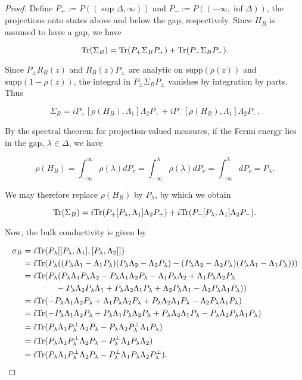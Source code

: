 \documentclass[12pt, letterpaper]{article}
\begin{document}
\begin{proof}
Define $P_+ := P((\sup \Delta, \infty))$ and $P_- := P((-\infty, \inf \Delta))$, the projections onto states above and below the gap, respectively. Since $H_B$ is assumed to have a gap, we have 

\[\text{Tr}(\Sigma_B) = \text{Tr}(P_+\Sigma_B P_+) + \text{Tr}(P_-\Sigma_B P_-).\]

Since $P_\pm R_B(z)$ and $R_B(z) P_\pm$ are analytic on $\text{supp}(\rho(z))$ and $\text{supp}(1-\rho(z))$, the integral in $P_\pm \Sigma_B P_\pm$ vanishes by integration by parts. Thus

\[\Sigma_B = iP_+[\rho(H_B),\Lambda_1]\Lambda_2P_+ + iP_-[\rho(H_B),\Lambda_1]\Lambda_2P_-.\]

By the spectral theorem for projection-valued measures, if the Fermi energy lies in the gap, $\lambda \in \Delta$, we have

\[ \rho(H_B) = \int_{-\infty}^\infty \rho(\lambda) dP_\nu = \int_{-\infty}^\lambda \rho(\lambda) dP_\nu = \int_{-\infty}^\lambda dP_\nu = P_\lambda.\]

We may therefore replace $\rho(H_B)$ by $P_\lambda$, by which we obtain

\[\text{Tr}(\Sigma_B) = i\text{Tr}(P_+[P_\lambda,\Lambda_1]\Lambda_2P_+) + i\text{Tr}(P_-[P_\lambda,\Lambda_1]\Lambda_2P_-).\]

Now, the bulk conductivity is given by

\[\begin{aligned}
\sigma_B &= i\text{Tr}(P_\lambda [[P_\lambda, \Lambda_1],[P_\lambda,\Lambda_2]])\\
&= i\text{Tr}(P_\lambda ((P_\lambda \Lambda_1-\Lambda_1P_\lambda)(P_\lambda\Lambda_2 - \Lambda_2P_\lambda) - (P_\lambda\Lambda_2 - \Lambda_2P_\lambda)(P_\lambda\Lambda_1-\Lambda_1P_\lambda)))\\
&= i\text{Tr}(P_\lambda(P_\lambda\Lambda_1P_\lambda\Lambda_2 - P_\lambda\Lambda_1\Lambda_2 P_\lambda - \Lambda_1P_\lambda\Lambda_2 + \Lambda_1P_\lambda\Lambda_2P_\lambda \\
&\quad\quad\quad\quad - P_\lambda\Lambda_2P_\lambda\Lambda_1 + P_\lambda\Lambda_2\Lambda_1P_\lambda + \Lambda_2P_\lambda\Lambda_1 - \Lambda_2P_\lambda\Lambda_1P_\lambda))\\
&= i\text{Tr}(- P_\lambda\Lambda_1\Lambda_2 P_\lambda + \Lambda_1P_\lambda\Lambda_2P_\lambda + P_\lambda\Lambda_2\Lambda_1P_\lambda - \Lambda_2P_\lambda\Lambda_1P_\lambda)\\
&= i\text{Tr}(- P_\lambda\Lambda_1\Lambda_2 P_\lambda + P_\lambda\Lambda_1P_\lambda\Lambda_2P_\lambda + P_\lambda\Lambda_2\Lambda_1P_\lambda - P_\lambda\Lambda_2P_\lambda\Lambda_1P_\lambda)\\
&= i\text{Tr}(P_\lambda\Lambda_1 P_\lambda^\perp \Lambda_2P_\lambda - P_\lambda\Lambda_2 P_\lambda^\perp \Lambda_1 P_\lambda)\\
&= i\text{Tr}(P_\lambda\Lambda_1 P_\lambda^\perp \Lambda_2P_\lambda -  P_\lambda^\perp \Lambda_1 P_\lambda\Lambda_2)\\
&= i\text{Tr}(P_\lambda\Lambda_1 P_\lambda^\perp \Lambda_2P_\lambda -  P_\lambda^\perp \Lambda_1 P_\lambda\Lambda_2P_\lambda^\perp).
\end{aligned}\]


\end{proof}
\end{document}
